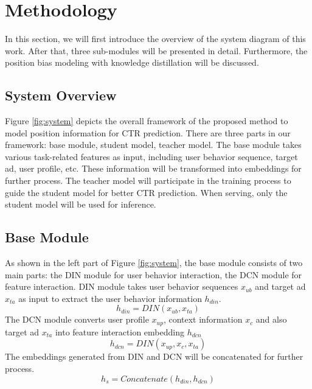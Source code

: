 \documentclass[sigconf,natbib=true,anonymous=false]{acmart}
\begin{document}

\section{Methodology}
\label{sec:method}


In this section, we will first introduce the overview of the system diagram of this work. After that, three sub-modules will be presented in detail. Furthermore, the position bias modeling with knowledge distillation will be discussed.

\subsection{System Overview}

Figure \ref{fig:system} depicts the overall framework of the proposed method to model position information for CTR prediction.
There are three parts in our framework: base module, student model, teacher model.
The base module takes various task-related features as input, including user behavior sequence, target ad, user profile, etc. These information will be transformed into embeddings for further process.
The teacher model will participate in the training process to guide the student model for better CTR prediction. When serving, only the student model will be used for inference.

\subsection{Base Module}
As shown in the left part of Figure \ref{fig:system}, the base module consists of two main parts: the DIN module for user behavior interaction, the DCN module for feature interaction.
DIN module takes user behavior sequences $x_{ub}$ and target ad $x_{ta}$ as input to extract the user behavior information $h_{din}$.
\begin{equation}
    h_{din} = DIN(x_{ub},x_{ta})
\end{equation}
The DCN module converts user profile $x_{up}$, context information $x_c$ and also target ad $x_{ta}$ into feature interaction embedding $h_{dcn}$ \begin{equation}
    h_{dcn} = DIN(x_{up},x_{c},x_{ta})
\end{equation}
The embeddings generated from DIN and DCN will be concatenated for further process.
\begin{equation}
    h_{s} = Concatenate(h_{din},h_{dcn})
\end{equation}
\end{document}
